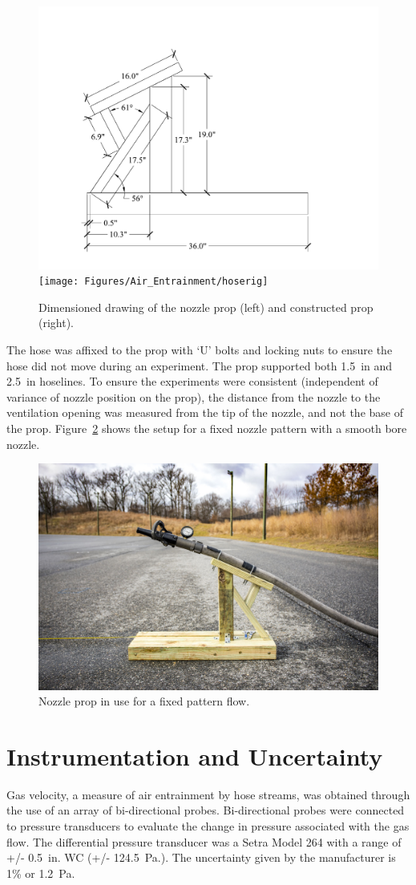 \documentclass[12pt,oneside]{book}
\begin{document}
\begin{figure}[!ht]
\centering
    \includegraphics[width=.45\columnwidth]{Figures/Water_Distribution/GIBside}
	\texttt{[image: Figures/Air\_Entrainment/hoserig]}
	\caption[Nozzle Prop]{Dimensioned drawing of the nozzle prop (left) and constructed prop (right).}
	\label{fig:Nozzle_Prop}
\end{figure}

The hose was affixed to the prop with `U' bolts and locking nuts to ensure the hose did not move during an experiment. The prop supported both 1.5~in and 2.5~in hoselines. To ensure the experiments were consistent (independent of variance of nozzle position on the prop), the distance from the nozzle to the ventilation opening was measured from the tip of the nozzle, and not the base of the prop. Figure~\ref{fig:Nozzle_Prop_in_Use} shows the setup for a fixed nozzle pattern with a smooth bore nozzle.

\begin{figure}[!ht]
\centering
\includegraphics[width=.6\columnwidth]{Figures/Air_Entrainment/gib_hose} 
\caption[Nozzle Prop in Use]{Nozzle prop in use for a fixed pattern flow.}
\label{fig:Nozzle_Prop_in_Use}
\end{figure}

\section{Instrumentation and Uncertainty}
\label{sec:uncert}
Gas velocity, a measure of air entrainment by hose streams, was obtained through the use of an array of bi-directional probes. Bi-directional probes were connected to pressure transducers to evaluate the change in pressure associated with the gas flow. The differential pressure transducer was a Setra Model 264 with a range of +/- 0.5~in. WC (+/- 124.5~Pa.). The uncertainty given by the manufacturer is 1\% or 1.2~Pa. 
\end{document}
